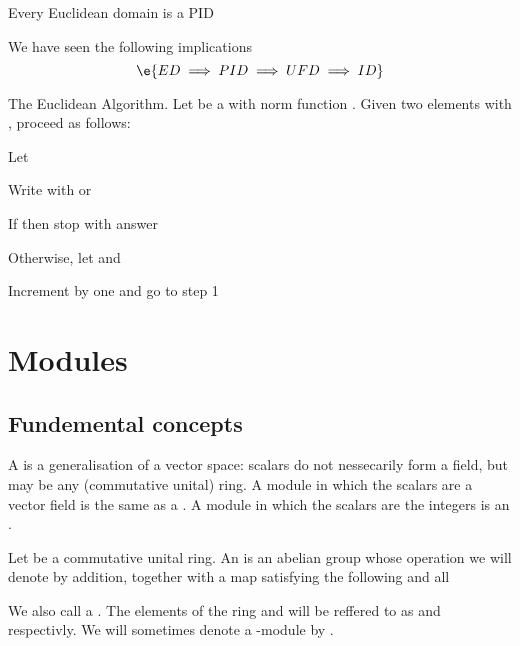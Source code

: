 \begin{Le}
\begin{T} Every Euclidean domain is a PID \end{T} 

\begin{R} We have seen the following implications 
$$\e{ED\implies PID\implies UFD \implies ID}$$
\end{R}

\begin{A}
The Euclidean Algorithm. Let  be a  with norm function \e{$\sigma$}. Given two elements  with , proceed as follows:
\begin{compactitem}
\item Let 
\item Write  with  or 
\item If  then stop with answer 
\item Otherwise, let  and 
\item Increment  by one and go to step 1
\end{compactitem}








\section{Modules}
\subsection{Fundemental concepts}
A  is a generalisation of a vector space: scalars do not nessecarily form a field, but may be any (commutative unital) ring. A module in which the scalars are a vector field is the same as a . A module in which the scalars are the integers is an . 

\begin{D} Let  be a commutative unital ring. An   is an abelian group whose operation we will denote by addition, together with a map  satisfying the following  and all 
\begin{compactitem}
\item {}
\item {}
\item {}
\item {}
\end{compactitem}
We also call  a  . The elements of the ring  and  will be reffered to as   and  respectivly. We will sometimes denote a -module by . \end{D}


\end{A}
\end{Le}
